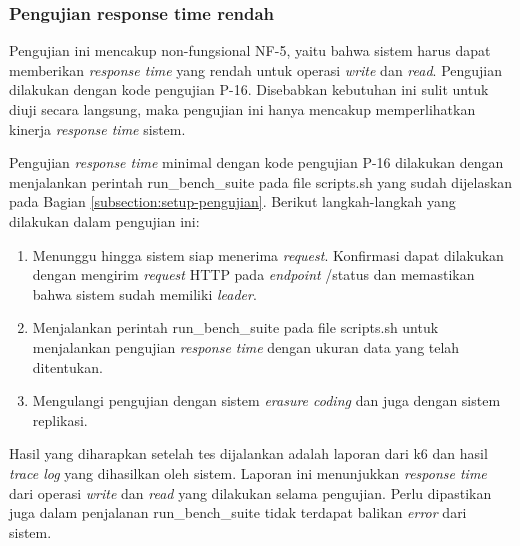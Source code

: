 \subsubsection{Pengujian response time rendah}
\label{subsubsection:pengujian-response-time-rendah}

Pengujian ini mencakup non-fungsional NF-5, yaitu bahwa sistem harus dapat memberikan \textit{response time} yang rendah untuk operasi \textit{write} dan \textit{read}. Pengujian dilakukan dengan kode pengujian P-16. Disebabkan kebutuhan ini sulit untuk diuji secara langsung, maka pengujian ini hanya mencakup memperlihatkan kinerja \textit{response time} sistem.


Pengujian \textit{response time} minimal dengan kode pengujian P-16 dilakukan dengan menjalankan perintah run\_bench\_suite pada file scripts.sh yang sudah dijelaskan pada Bagian \ref{subsection:setup-pengujian}. Berikut langkah-langkah yang dilakukan dalam pengujian ini:

\begin{enumerate}
  \item Menunggu hingga sistem siap menerima \textit{request}. Konfirmasi dapat dilakukan dengan mengirim \textit{request} HTTP pada \textit{endpoint} /status dan memastikan bahwa sistem sudah memiliki \textit{leader}.
  \item Menjalankan perintah run\_bench\_suite pada file scripts.sh untuk menjalankan pengujian \textit{response time} dengan ukuran data yang telah ditentukan.
  \item Mengulangi pengujian dengan sistem \textit{erasure coding} dan juga dengan sistem replikasi.
\end{enumerate}

Hasil yang diharapkan setelah tes dijalankan adalah laporan dari k6 dan hasil \textit{trace log} yang dihasilkan oleh sistem. Laporan ini menunjukkan \textit{response time} dari operasi \textit{write} dan \textit{read} yang dilakukan selama pengujian. Perlu dipastikan juga dalam penjalanan run\_bench\_suite tidak terdapat balikan \textit{error} dari sistem.
